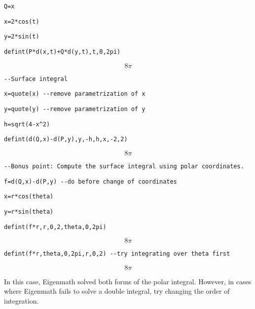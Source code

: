 \verb$Q=x$

\verb$x=2*cos(t)$

\verb$y=2*sin(t)$

\verb$defint(P*d(x,t)+Q*d(y,t),t,0,2pi)$

$$8\pi$$

\verb$--Surface integral$

\verb$x=quote(x) --remove parametrization of x$

\verb$y=quote(y) --remove parametrization of y$

\verb$h=sqrt(4-x^2)$

\verb$defint(d(Q,x)-d(P,y),y,-h,h,x,-2,2)$

$$8\pi$$

\verb$--Bonus point: Compute the surface integral using polar coordinates.$

\verb$f=d(Q,x)-d(P,y) --do before change of coordinates$

\verb$x=r*cos(theta)$

\verb$y=r*sin(theta)$

\verb$defint(f*r,r,0,2,theta,0,2pi)$

$$8\pi$$

\verb$defint(f*r,theta,0,2pi,r,0,2) --try integrating over theta first$

$$8\pi$$

\medskip
\noindent
In this case, Eigenmath solved both forms of the polar integral.
However, in cases where Eigenmath fails to solve a double integral, try
changing the order of integration.
